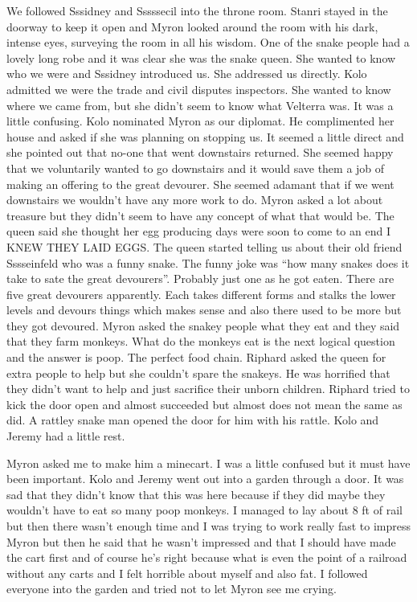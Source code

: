 We followed Sssidney and Sssssecil into the throne room. Stanri stayed in the doorway to keep it open and Myron looked around the room with his dark, intense eyes, surveying the room in all his wisdom. One of the snake people had a lovely long robe and it was clear she was the snake queen. She wanted to know who we were and Sssidney introduced us. She addressed us directly. Kolo admitted we were the trade and civil disputes inspectors. She wanted to know where we came from, but she didn’t seem to know what Velterra was. It was a little confusing. Kolo nominated Myron as our diplomat. He complimented her house and asked if she was planning on stopping us. It seemed a little direct and she pointed out that no-one that went downstairs returned. She seemed happy that we voluntarily wanted to go downstairs and it would save them a job of making an offering to the great devourer. She seemed adamant that if we went downstairs we wouldn’t have any more work to do. Myron asked a lot about treasure but they didn’t seem to have any concept of what that would be. The queen said she thought her egg producing days were soon to come to an end I KNEW THEY LAID EGGS. The queen started telling us about their old friend Sssseinfeld who was a funny snake. The funny joke was “how many snakes does it take to sate the great devourers”. Probably just one as he got eaten. There are five great devourers apparently. Each takes different forms and stalks the lower levels and devours things which makes sense and also there used to be more but they got devoured. Myron asked the snakey people what they eat and they said that they farm monkeys. What do the monkeys eat is the next logical question and the answer is poop. The perfect food chain. Riphard asked the queen for extra people to help but she couldn’t spare the snakeys. He was horrified that they didn’t want to help and just sacrifice their unborn children. Riphard tried to kick the door open and almost succeeded but almost does not mean the same as did. A rattley snake man opened the door for him with his rattle. Kolo and Jeremy had a little rest.\medskip

Myron asked me to make him a minecart. I was a little confused but it must have been important. Kolo and Jeremy went out into a garden through a door. It was sad that they didn’t know that this was here because if they did maybe they wouldn’t have to eat so many poop monkeys. I managed to lay about 8 ft of rail but then there wasn’t enough time and I was trying to work really fast to impress Myron but then he said that he wasn’t impressed and that I should have made the cart first and of course he’s right because what is even the point of a railroad without any carts and I felt horrible about myself and also fat. I followed everyone into the garden and tried not to let Myron see me crying.\medskip

